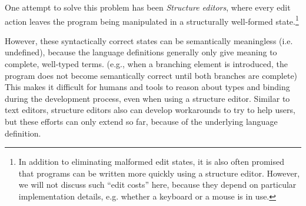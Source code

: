 One attempt to solve this problem has been \emph{Structure editors},
where every edit action leaves the program being manipulated in a 
structurally well-formed state.\footnote{In addition to eliminating malformed edit states, it is also often promised that programs can be written more quickly using a structure editor. However, we will not discuss such ``edit costs'' here, because they depend on particular implementation details, e.g. whether a keyboard or a mouse is in use.} 

However, these syntactically correct states can be semantically meaningless (i.e. undefined), because the language definitions generally only give meaning to complete, well-typed terms. (e.g., when a branching element is introduced, the program does not become semantically correct until both branches are complete)
This makes it difficult for humans and tools to reason about types and binding during the development process, even when using a structure editor.
Similar to text editors, structure editors also can develop workarounds to try to help users, but these efforts can only extend so far, because of the underlying language definition.



